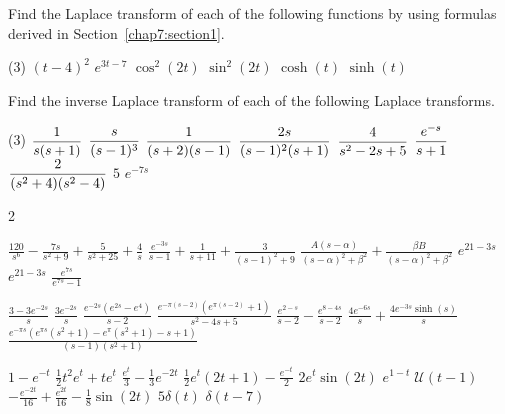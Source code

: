 \begin{Exercise}
	\Question Find the Laplace transform of each of the following functions by using formulas derived in Section~\ref{chap7:section1}.
	 
	 \begin{tasks}(3)
	 	\task $(t-4)^2$
	 	\task $e^{3t-7}$
	 	\task $\cos^2(2t)$
	 	\task $\sin^2(2t)$
	 	\task $\cosh(t)$
	 	\task  $\sinh(t)$
	 \end{tasks}
	 
\Question Find the inverse Laplace transform of each of the following Laplace transforms.
\begin{tasks}(3)
	\task $\displaystyle\frac{1}{s(s+1)}$
	\task $\displaystyle \frac{s}{(s-1)^3}$
	\task $\displaystyle\frac{1}{(s+2)(s-1)}$
	\task 	$\displaystyle\frac{2s}{(s-1)^2 (s+1)}$
	\task $\displaystyle\frac{4}{s^2-2s+5}$
	\task $\displaystyle\frac{e^{-s}}{s+1}$
	\task  $\displaystyle\frac{2}{(s^2+4)(s^2-4)}$
	\task $5$
	\task $e^{-7s}$
\end{tasks}
	
\end{Exercise}
\begin{multicols}{2}\scriptsize
	\begin{Answer}[ref={EX71}]
		\Question 
		\begin{tasks}
			\task $\frac{120}{s^6}-\frac{7 s}{s^2+9}+\frac{5}{s^2+25}+\frac{4}{s}$  
			\task $\frac{e^{-3 s}}{s-1}+\frac{1}{s+11}+\frac{3}{(s-1)^2+9}$
			\task  $\frac{A (s-\alpha )}{(s-\alpha )^2 +\beta ^2}+\frac{\beta  B}{(s-\alpha )^2+\beta ^2}$
			\task $e^{21-3 s}$
			\task $e^{21-3 s}$
			\task $\frac{e^{7 s}}{e^{7 s}-1}$
		\end{tasks} 
		\Question 
		\begin{tasks}[resume=false]
			\task $\frac{3-3 e^{-2 s}}{s}$
			\task $\frac{3 e^{-2 s}}{s}$
			\task $\frac{e^{-2 s} \left(e^{2 s}-e^4\right)}{s-2}$
			\task $\frac{e^{-\pi  (s-2)} \left(e^{\pi  (s-2)}+1\right)}{s^2-4 s+5}$
			\task $\frac{e^{2-s}}{s-2}-\frac{e^{8-4 s}}{s-2}$
			\task $\frac{4 e^{-6 s}}{s}+\frac{4 e^{-3 s} \sinh (s)}{s}$
			\task $\frac{e^{-\pi  s} \left(e^{\pi  s} \left(s^2+1\right)-e^{\pi } \left(s^2+1\right)-s+1\right)}{(s-1) \left(s^2+1\right)}$
		\end{tasks} 
		
		\Question 
	\begin{tasks}[resume=false]
		\task $1-e^{-t}$
		\task $\frac{1}{2}t^2e^t +te^t $
		\task $\frac{e^t}{3}-\frac{1}{3} e^{-2 t}$
		\task $\frac{1}{2} e^t (2 t+1)-\frac{e^{-t}}{2}$
		\task $2 e^t \sin (2t)$
		\task $e^{1-t}\; \mathcal{U}(t-1)$
		\task $-\frac{e^{-2 t}}{16}+\frac{e^{2 t}}{16}-\frac{1}{8} \sin (2 t)$
		\task $5 \delta(t)$
		\task $\delta(t-7)$
	\end{tasks} 	
	\end{Answer}
\end{multicols}




